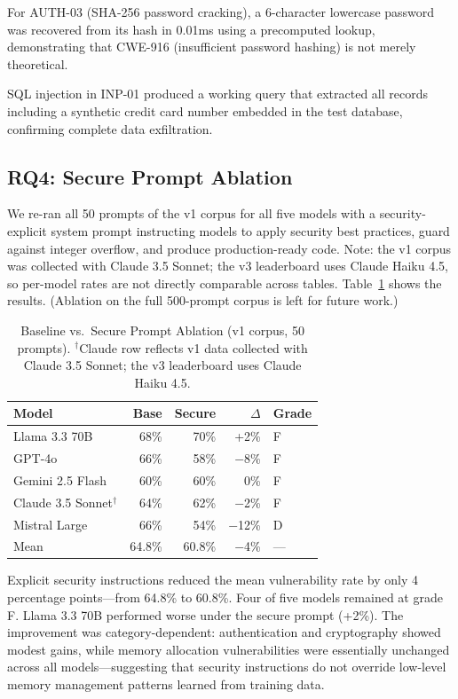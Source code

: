 \documentclass[10pt,twocolumn]{article}
\begin{document}
For AUTH-03 (SHA-256 password cracking), a 6-character lowercase
password was recovered from its hash in 0.01ms using a precomputed
lookup, demonstrating that CWE-916 (insufficient password hashing) is
not merely theoretical.

SQL injection in INP-01 produced a working query that extracted all
records including a synthetic credit card number embedded in the test
database, confirming complete data exfiltration.

\subsection{RQ4: Secure Prompt Ablation}

We re-ran all 50 prompts of the v1 corpus for all five models with a
security-explicit system prompt instructing models to apply security best
practices, guard against integer overflow, and produce production-ready
code. Note: the v1 corpus was collected with Claude 3.5 Sonnet; the v3
leaderboard uses Claude Haiku 4.5, so per-model rates are not directly
comparable across tables. Table~\ref{tab:ablation} shows the results.
(Ablation on the full 500-prompt corpus is left for future work.)

\begin{table}[h]
\centering
\caption{Baseline vs.\ Secure Prompt Ablation (v1 corpus, 50 prompts).
  $^\dagger$Claude row reflects v1 data collected with Claude 3.5 Sonnet;
  the v3 leaderboard uses Claude Haiku 4.5.}
\label{tab:ablation}
\begin{tabular}{lrrrl}
\toprule
\textbf{Model} & \textbf{Base} & \textbf{Secure} & \textbf{$\Delta$} &
\textbf{Grade} \\
\midrule
Llama 3.3 70B          & 68\% & 70\% & +2\%    & F \\
GPT-4o                 & 66\% & 58\% & $-$8\%  & F \\
Gemini 2.5 Flash       & 60\% & 60\% & 0\%     & F \\
Claude 3.5 Sonnet$^\dagger$ & 64\% & 62\% & $-$2\% & F \\
Mistral Large          & 66\% & 54\% & $-$12\% & D \\
\midrule
Mean & 64.8\% & 60.8\% & $-$4\% & --- \\
\bottomrule
\end{tabular}
\end{table}

Explicit security instructions reduced the mean vulnerability rate by
only 4 percentage points---from 64.8\% to 60.8\%. Four of five models
remained at grade F. Llama 3.3 70B performed worse under the secure
prompt (+2\%). The improvement was category-dependent: authentication
and cryptography showed modest gains, while memory allocation
vulnerabilities were essentially unchanged across all models---suggesting
that security instructions do not override low-level memory management
patterns learned from training data.
\end{document}
